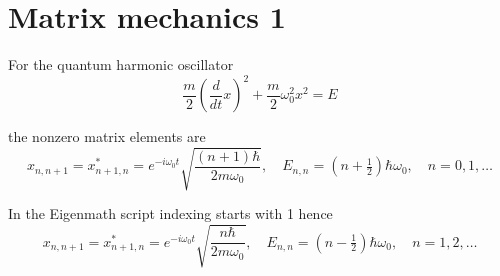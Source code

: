 

\section*{Matrix mechanics 1}

For the quantum harmonic oscillator
\begin{equation*}
\frac{m}{2}\left(\frac{d}{dt}x\right)^2+\frac{m}{2}\omega_0^2x^2=E
\tag{1}
\end{equation*}

the nonzero matrix elements are
\begin{equation*}
x_{n,n+1}=x_{n+1,n}^*=e^{-i\omega_0t}\sqrt{\frac{(n+1)\hbar}{2m\omega_0}},\quad
E_{n,n}=\left(n+\tfrac{1}{2}\right)\hbar\omega_0,\quad
n=0,1,\ldots
\end{equation*}

In the Eigenmath script indexing starts with 1 hence
\begin{equation*}
x_{n,n+1}=x_{n+1,n}^*=e^{-i\omega_0t}\sqrt{\frac{n\hbar}{2m\omega_0}},\quad
E_{n,n}=\left(n-\tfrac{1}{2}\right)\hbar\omega_0,\quad
n=1,2,\ldots
\end{equation*}


